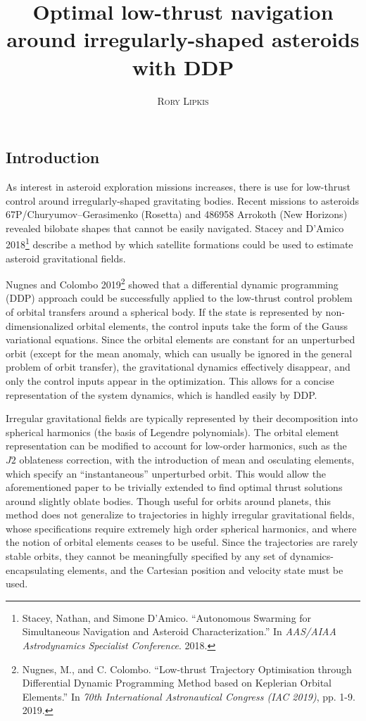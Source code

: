 \documentclass{article}
\title{\textbf{Optimal low-thrust navigation around irregularly-shaped asteroids with DDP}}
\author{\textsc{Rory Lipkis}}
\date{}
\begin{document}
\maketitle

\begin{multicols}{2}
\section*{Introduction}
As interest in asteroid exploration missions increases, there is use for low-thrust control around irregularly-shaped gravitating bodies. Recent missions to asteroids 67P/Churyumov–Gerasimenko (Rosetta) and 486958 Arrokoth (New Horizons) revealed bilobate shapes that cannot be easily navigated. Stacey and D'Amico 2018\footnote{Stacey, Nathan, and Simone D’Amico. ``Autonomous Swarming for Simultaneous Navigation and Asteroid Characterization.'' In \emph{AAS/AIAA Astrodynamics Specialist Conference}. 2018.} describe a method by which satellite formations could be used to estimate asteroid gravitational fields.


Nugnes and Colombo 2019\footnote{Nugnes, M., and C. Colombo. ``Low-thrust Trajectory Optimisation through Differential Dynamic Programming Method based on Keplerian Orbital Elements.'' In \emph{70th International Astronautical Congress (IAC 2019)}, pp. 1-9. 2019.} showed that a differential dynamic programming (DDP) approach could be successfully applied to the low-thrust control problem of orbital transfers around a spherical body. If the state is represented by non-dimensionalized orbital elements, the control inputs take the form of the Gauss variational equations. Since the orbital elements are constant for an unperturbed orbit (except for the mean anomaly, which can usually be ignored in the general problem of orbit transfer), the gravitational dynamics effectively disappear, and only the control inputs appear in the optimization. This allows for a concise representation of the system dynamics, which is handled easily by DDP.

Irregular gravitational fields are typically represented by their decomposition into spherical harmonics (the basis of Legendre polynomials). The orbital element representation can be modified to account for low-order harmonics, such as the $J2$ oblateness correction, with the introduction of mean and osculating elements, which specify an ``instantaneous'' unperturbed orbit. This would allow the aforementioned paper to be trivially extended to find optimal thrust solutions around slightly oblate bodies. Though useful for orbits around planets, this method does not generalize to trajectories in highly irregular gravitational fields, whose specifications require extremely high order spherical harmonics, and where the notion of orbital elements ceases to be useful. Since the trajectories are rarely stable orbits, they cannot be meaningfully specified by any set of dynamics-encapsulating elements, and the Cartesian position and velocity state must be used.

\end{multicols}
\end{document}
